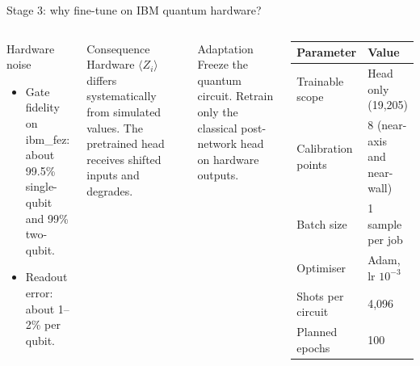 \documentclass[aspectratio=169]{beamer}
\begin{document}
\begin{frame}{Stage 3: why fine-tune on IBM quantum hardware?}
\begin{columns}[T,onlytextwidth]
\begin{block}{Hardware noise}
\begin{itemize}\small
  \item Gate fidelity on ibm\_fez: about 99.5\% single-qubit and 99\% two-qubit.
  \item Readout error: about 1--2\% per qubit.
\end{itemize}
\end{block}
\begin{block}{Consequence}
Hardware $\langle Z_i\rangle$ differs systematically from simulated values. The pretrained head receives shifted inputs and degrades.
\end{block}
\begin{exampleblock}{Adaptation}
Freeze the quantum circuit. Retrain only the classical post-network head on hardware outputs.
\end{exampleblock}
\begin{center}
\small
\begin{tabular}{ll}
\toprule
Parameter & Value \\
\midrule
Trainable scope & Head only (19,205) \\
Calibration points & 8 (near-axis and near-wall) \\
Batch size & 1 sample per job \\
Optimiser & Adam, lr $10^{-3}$ \\
Shots per circuit & 4,096 \\
Planned epochs & 100 \\
\bottomrule
\end{tabular}
\end{center}
\end{columns}
\end{frame}
\end{document}
